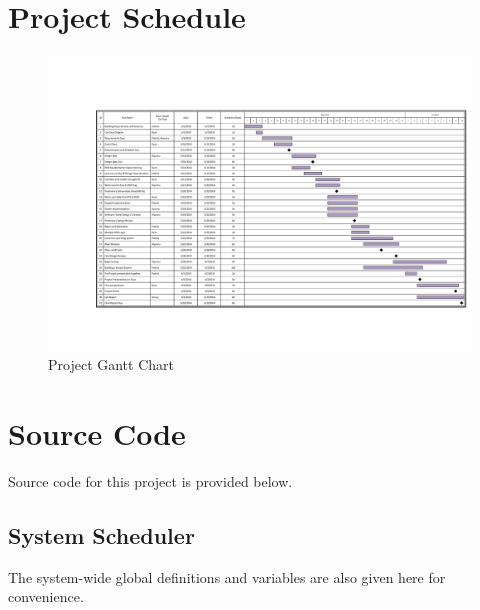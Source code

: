 \documentclass[12pt]{article} %
\begin{document}
\section{Project Schedule\label{appendix:ganttChart}}
\begin{figure}[H]
	\centering
	\begin{adjustbox} {rotate=90,center}
		\includegraphics[width=\textwidth]{images/NewGantt.pdf}
	\end{adjustbox}
	\caption{Project Gantt Chart}
	\label{fig:ganttChart}
\end{figure}

\clearpage
\section{Source Code}
%    
%
%    
Source code for this project is provided below.

\subsection{System Scheduler}
The system-wide global definitions and variables are also given here for convenience.



\end{document}

